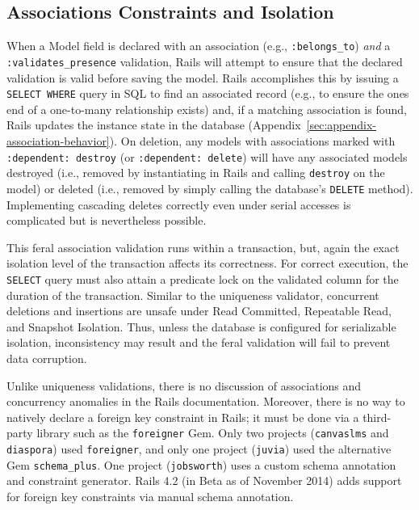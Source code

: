 \subsection{Associations Constraints and Isolation}

When a Model field is declared with an association (e.g.,
\texttt{:belongs\_to}) \textit{and} a \texttt{:validates\_presence}
validation, Rails will attempt to ensure that the declared validation
is valid before saving the model. Rails accomplishes this by issuing a
\texttt{SELECT WHERE} query in SQL to find an associated record (e.g.,
to ensure the ones end of a one-to-many relationship exists) and, if a
matching association is found, Rails updates the instance state in the
database (Appendix~\ref{sec:appendix-association-behavior}). On
deletion, any models with associations marked with \texttt{:dependent:
  destroy} (or \texttt{:dependent: delete}) will have any associated
models destroyed (i.e., removed by instantiating in Rails and calling
\texttt{destroy} on the model) or deleted (i.e., removed by simply
calling the database's \texttt{DELETE} method). Implementing cascading
deletes correctly even under serial accesses is complicated but is
nevertheless possible.

This feral association validation runs within a transaction, but,
again the exact isolation level of the transaction affects its
correctness. For correct execution, the \texttt{SELECT} query must
also attain a predicate lock on the validated column for the duration
of the transaction. Similar to the uniqueness validator, concurrent
deletions and insertions are unsafe under Read Committed, Repeatable
Read, and Snapshot Isolation. Thus, unless the database is configured
for serializable isolation, inconsistency may result and the feral
validation will fail to prevent data corruption.

Unlike uniqueness validations, there is no discussion of associations
and concurrency anomalies in the Rails documentation. Moreover, there
is no way to natively declare a foreign key constraint in Rails; it
must be done via a third-party library such as the \texttt{foreigner}
Gem. Only two projects (\texttt{canvaslms} and \texttt{diaspora}) used
\texttt{foreigner}, and only one project (\texttt{juvia}) used the
alternative Gem \texttt{schema\_plus}. One project
(\texttt{jobsworth}) uses a custom schema annotation and constraint
generator. Rails 4.2 (in Beta as of November 2014) adds support for
foreign key constraints via manual schema annotation.

